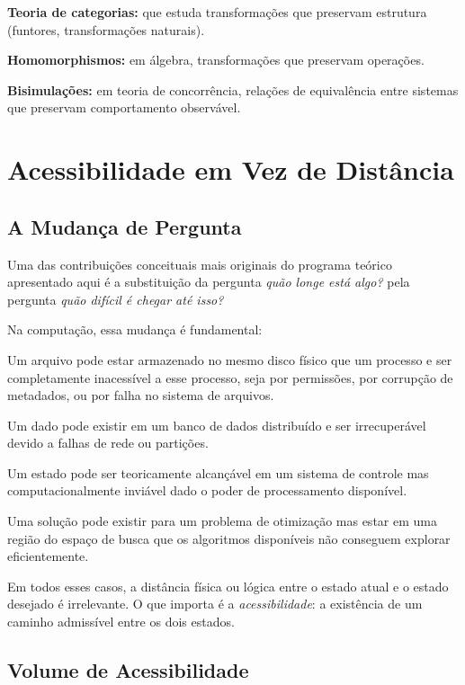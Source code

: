 \documentclass[11pt, a4paper]{article}
\theoremstyle{named}
\begin{document}
\textbf{Teoria de categorias:} que estuda transformações que preservam
estrutura (funtores, transformações naturais).

\textbf{Homomorphismos:} em álgebra, transformações que preservam
operações.

\textbf{Bisimulações:} em teoria de concorrência, relações de
equivalência entre sistemas que preservam comportamento observável.

\section{Acessibilidade em Vez de Distância}

\subsection{A Mudança de Pergunta}

Uma das contribuições conceituais mais originais do programa teórico
apresentado aqui é a substituição da pergunta \emph{quão longe está
algo?} pela pergunta \emph{quão difícil é chegar até isso?}

Na computação, essa mudança é fundamental:

Um arquivo pode estar armazenado no mesmo disco físico que um processo
e ser completamente inacessível a esse processo, seja por permissões,
por corrupção de metadados, ou por falha no sistema de arquivos.

Um dado pode existir em um banco de dados distribuído e ser
irrecuperável devido a falhas de rede ou partições.

Um estado pode ser teoricamente alcançável em um sistema de controle
mas computacionalmente inviável dado o poder de processamento disponível.

Uma solução pode existir para um problema de otimização mas estar em
uma região do espaço de busca que os algoritmos disponíveis não
conseguem explorar eficientemente.

Em todos esses casos, a distância física ou lógica entre o estado atual
e o estado desejado é irrelevante. O que importa é a \emph{acessibilidade}:
a existência de um caminho admissível entre os dois estados.

\subsection{Volume de Acessibilidade}
\end{document}
